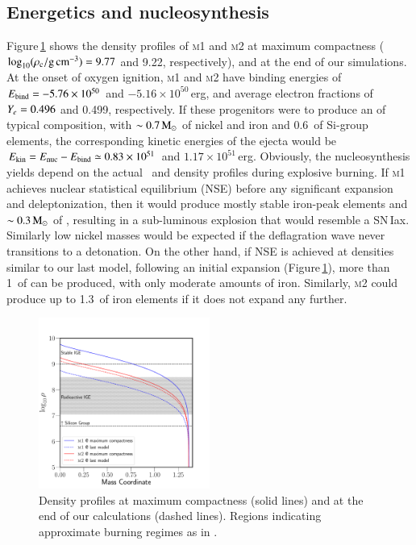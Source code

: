\documentclass[twocolumn]{aa}
\begin{document}
\subsection{Energetics and nucleosynthesis}\label{sec:3}
Figure\,\ref{fig:nuc} shows the density profiles of \textsc{m1} and \textsc{m2} at maximum compactness ($\log_{10} (\rho_{\mathrm{c}}/ \mathrm{g\,cm^{-3}})=9.77$ and 9.22, respectively), and at the end of our simulations. At the onset of oxygen ignition, \textsc{m1} and \textsc{m2} have binding energies of $E_{\rm bind}=-5.76\times10^{50}$ and $-5.16\times10^{50}$\,erg, and average electron fractions of $Y_e= 0.496$ and  0.499, respectively. If these progenitors were to produce an \ia of  typical composition, with $\sim 0.7\mathrm{\,M_\odot}$ of nickel and iron and 0.6\msun\ of Si-group elements, the corresponding kinetic energies of the ejecta would be $E_{\rm kin}=E_{\rm nuc}-E_{\rm bind}\simeq 0.83\times10^{51}$ and  $1.17\times10^{51}$\,erg. 
Obviously, the nucleosynthesis yields depend on the actual
\ye\ and density profiles during explosive burning. If 
\textsc{m1} achieves nuclear statistical equilibrium (NSE)
before any significant expansion and deleptonization, then it
would produce mostly stable iron-peak elements and $\sim 0.3\mathrm{\,M_\odot}$ of , resulting in a sub-luminous 
explosion that would resemble a SN\,Iax.  Similarly low nickel masses would be expected if the deflagration wave never transitions to a detonation. On the other hand, if NSE is achieved at densities similar to our last \mesa model, following an 
initial expansion (Figure\,\ref{fig:nuc}), more than 
1\msun\ of  can be produced, with only moderate
amounts of iron. Similarly, \textsc{m2} could produce up 
to 1.3\msun\ of iron elements if it does not expand any further. 

\begin{figure}
\begin{center}
\includegraphics[width=0.5\textwidth]{composition.pdf}
\caption{Density profiles at maximum compactness (solid lines) and at the end of our \mesa calculations (dashed lines). Regions indicating approximate burning regimes as in \cite{Seitenzahl2017}.}
\label{fig:nuc}
\end{center}
\end{figure}
\end{document}

